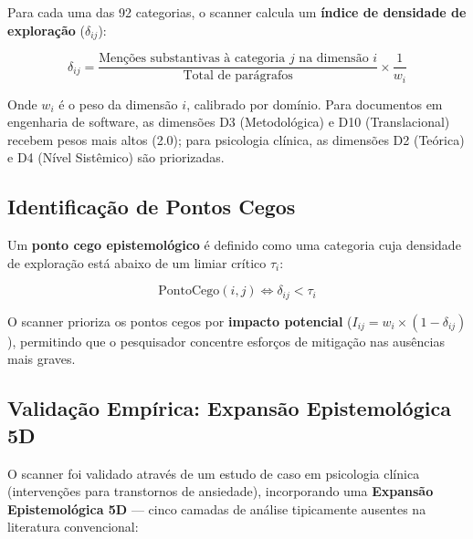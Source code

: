 Para cada uma das 92 categorias, o scanner calcula um \textbf{índice de densidade de exploração} ($\delta_{ij}$):

\[
\delta_{ij} = \frac{\text{Menções substantivas à categoria } j \text{ na dimensão } i}{\text{Total de parágrafos}} \times \frac{1}{w_i}
\]

Onde $w_i$ é o peso da dimensão $i$, calibrado por domínio. Para documentos em engenharia de software, as dimensões D3 (Metodológica) e D10 (Translacional) recebem pesos mais altos (2.0); para psicologia clínica, as dimensões D2 (Teórica) e D4 (Nível Sistêmico) são priorizadas.

\subsection{Identificação de Pontos Cegos}

Um \textbf{ponto cego epistemológico} é definido como uma categoria cuja densidade de exploração está abaixo de um limiar crítico $\tau_i$:

\[
\text{PontoCego}(i,j) \iff \delta_{ij} < \tau_i
\]

O scanner prioriza os pontos cegos por \textbf{impacto potencial} ($I_{ij} = w_i \times (1 - \delta_{ij})$), permitindo que o pesquisador concentre esforços de mitigação nas ausências mais graves.

\subsection{Validação Empírica: Expansão Epistemológica 5D}

O scanner foi validado através de um estudo de caso em psicologia clínica (intervenções para transtornos de ansiedade), incorporando uma \textbf{Expansão Epistemológica 5D} --- cinco camadas de análise tipicamente ausentes na literatura convencional:

